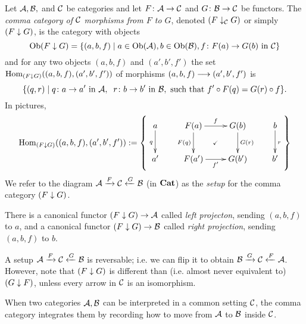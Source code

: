 \documentclass[CT4S-EN-RU]{subfiles}
\begin{document}
\begin{definitionENG}\label{def:comma category}
Let $\mathcal{A},\mathcal{B},$ and $\mathcal{C}$ be categories and let $F\colon\mathcal{A}\rightarrow\mathcal{C}$ and $G\colon\mathcal{B}\rightarrow\mathcal{C}$ be functors. The {\em comma category of $\mathcal{C}$ morphisms from $F$ to $G$}, denoted $(F\downarrow_\mathcal{C} G)$ or simply $(F\downarrow G)$, is the category with objects $$\textnormal{Ob}(F\downarrow G)=\{(a,b,f){\;|\;}a\in\textnormal{Ob}(\mathcal{A}), b\in\textnormal{Ob}(\mathcal{B}), f\colon F(a)\rightarrow G(b)\textnormal{ in }\mathcal{C}\}$$ and for any two objects $(a,b,f)$ and $(a',b',f')$ the set $\textnormal{Hom}_{(F\downarrow G)}((a,b,f),(a',b',f'))$ of morphisms $(a,b,f)\longrightarrow(a',b',f')$ is 
$$\{(q,r){\;|\;}q\colon a\rightarrow a'\textnormal{ in }\mathcal{A},\;\; r\colon b\rightarrow b'\textnormal{ in }\mathcal{B},\textnormal{ such that } f'\circ F(q)=G(r)\circ f\}.$$
In pictures,
$$\Hom_{(F\down G)}((a,b,f),(a',b',f')):=\left\{\parbox{2in}{\xymatrix{
a\ar[d]_q&F(a)\ar@{}[dr]|{\checkmark}\ar[r]^f\ar[d]_{F(q)}&G(b)\ar[d]^{G(r)}&b\ar[d]^r\\
a'&F(a')\ar[r]_{f'}&G(b')&b'
}}\right\}$$
We refer to the diagram $\mathcal{A}\xrightarrow{F}\mathcal{C}\xleftarrow{G}\mathcal{B}$ (in ${\mathbf{Cat}}$) as the {\em setup} for the comma category $(F\downarrow G)$.

There is a canonical functor $(F\downarrow G)\rightarrow\mathcal{A}$ called {\em left projecton}, sending $(a,b,f)$ to $a$, and a canonical functor $(F\downarrow G)\rightarrow\mathcal{B}$ called {\em right projection}, sending $(a,b,f)$ to $b$. 
\end{definitionENG}

\begin{definitionRUS}\label{def:comma category}
\end{definitionRUS}

\begin{blockENG}
A setup $\mathcal{A}\xrightarrow{F}\mathcal{C}\xleftarrow{G}\mathcal{B}$ is reversable; i.e. we can flip it to obtain $\mathcal{B}\xrightarrow{G}\mathcal{C}\xleftarrow{F}\mathcal{A}$. However, note that $(F\downarrow G)$ is different than (i.e. almost never equivalent to) $(G\downarrow F)$, unless every arrow in $\mathcal{C}$ is an isomorphism.
\end{blockENG}

\begin{blockRUS}
\end{blockRUS}

\begin{sloganENG}
When two categories $\mathcal{A},\mathcal{B}$ can be interpreted in a common setting $\mathcal{C}$, the comma category integrates them by recording how to move from $\mathcal{A}$ to $\mathcal{B}$ inside $\mathcal{C}$.
\end{sloganENG}

\begin{sloganRUS}
\end{sloganRUS}
\end{document}
